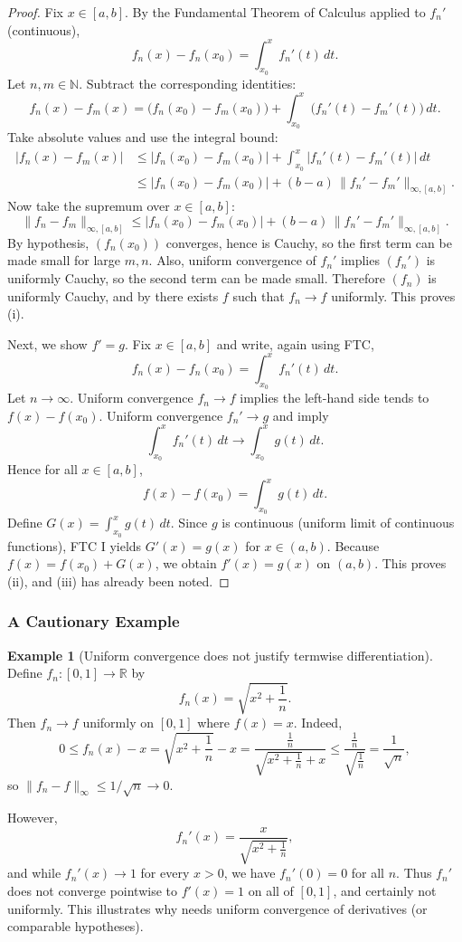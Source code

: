 \documentclass[12pt]{article}
\numberwithin{equation}{section}
\def\abs#1{|#1|}
\def\diff{d}
\newcommand{\RR}{\mathbb{R}}
\newcommand{\NN}{\mathbb{N}}
\DeclarePairedDelimiter{\abs}{\lvert}{\rvert}
\newcommand{\diff}{\mathop{}\!\mathrm{d}}    %
\theoremstyle{plain}
\theoremstyle{definition}
\newtheorem{example}[theorem]{Example}
\theoremstyle{remark}
\begin{document}
\begin{proof}
Fix $x\in[a,b]$. By the Fundamental Theorem of Calculus applied to $f_n'$ (continuous),
\[
f_n(x)-f_n(x_0)=\int_{x_0}^{x} f_n'(t)\,\diff t.
\]
Let $n,m\in\NN$. Subtract the corresponding identities:
\[
f_n(x)-f_m(x)
=
\bigl(f_n(x_0)-f_m(x_0)\bigr)+\int_{x_0}^{x}\bigl(f_n'(t)-f_m'(t)\bigr)\,\diff t.
\]
Take absolute values and use the integral bound:
\begin{align*}
\abs{f_n(x)-f_m(x)}
&\le \abs{f_n(x_0)-f_m(x_0)}
+\int_{x_0}^{x}\abs{f_n'(t)-f_m'(t)}\,\diff t\\
&\le \abs{f_n(x_0)-f_m(x_0)} + (b-a)\,\|f_n'-f_m'\|_{\infty,[a,b]}.
\end{align*}
Now take the supremum over $x\in[a,b]$:
\[
\|f_n-f_m\|_{\infty,[a,b]}
\le \abs{f_n(x_0)-f_m(x_0)} + (b-a)\,\|f_n'-f_m'\|_{\infty,[a,b]}.
\]
By hypothesis, $(f_n(x_0))$ converges, hence is Cauchy, so the first term can be made small for large $m,n$.
Also, uniform convergence of $f_n'$ implies $(f_n')$ is uniformly Cauchy, so the second term can be made small.
Therefore $(f_n)$ is uniformly Cauchy, and by  there exists $f$ such that $f_n\to f$ uniformly.
This proves (i).

Next, we show $f'=g$.
Fix $x\in[a,b]$ and write, again using FTC,
\[
f_n(x)-f_n(x_0)=\int_{x_0}^{x} f_n'(t)\,\diff t.
\]
Let $n\to\infty$.
Uniform convergence $f_n\to f$ implies the left-hand side tends to $f(x)-f(x_0)$.
Uniform convergence $f_n'\to g$ and  imply
\[
\int_{x_0}^{x} f_n'(t)\,\diff t \to \int_{x_0}^{x} g(t)\,\diff t.
\]
Hence for all $x\in[a,b]$,
\[
f(x)-f(x_0)=\int_{x_0}^{x} g(t)\,\diff t.
\]
Define $G(x)=\int_{x_0}^{x} g(t)\,\diff t$.
Since $g$ is continuous (uniform limit of continuous functions), FTC I yields $G'(x)=g(x)$ for $x\in(a,b)$.
Because $f(x)=f(x_0)+G(x)$, we obtain $f'(x)=g(x)$ on $(a,b)$.
This proves (ii), and (iii) has already been noted.
\end{proof}

\subsubsection{A Cautionary Example}

\begin{example}[Uniform convergence does not justify termwise differentiation]
Define $f_n:[0,1]\to\RR$ by
\[
f_n(x)=\sqrt{x^2+\frac{1}{n}}.
\]
Then $f_n\to f$ uniformly on $[0,1]$ where $f(x)=x$.
Indeed,
\[
0\le f_n(x)-x=\sqrt{x^2+\frac{1}{n}}-x
=\frac{\frac{1}{n}}{\sqrt{x^2+\frac{1}{n}}+x}
\le \frac{\frac{1}{n}}{\sqrt{\frac{1}{n}}}=\frac{1}{\sqrt{n}},
\]
so $\|f_n-f\|_\infty\le 1/\sqrt{n}\to 0$.

However,
\[
f_n'(x)=\frac{x}{\sqrt{x^2+\frac{1}{n}}},
\]
and while $f_n'(x)\to 1$ for every $x>0$, we have $f_n'(0)=0$ for all $n$.
Thus $f_n'$ does not converge pointwise to $f'(x)=1$ on all of $[0,1]$, and certainly not uniformly.
This illustrates why  needs uniform convergence of derivatives (or comparable hypotheses).
\end{example}
\end{document}
